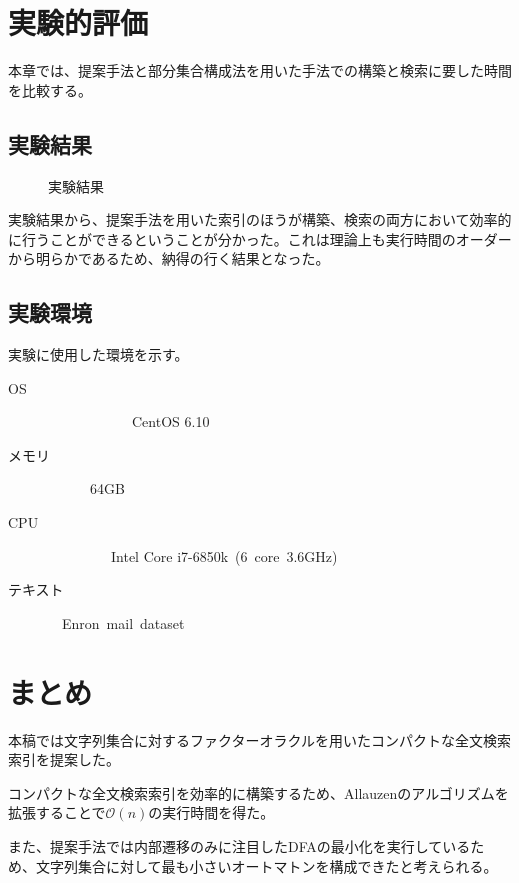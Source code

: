\documentclass[11pt,a4paper]{jreport}
\begin{document}
%

  \chapter{実験的評価}
  本章では、提案手法と部分集合構成法を用いた手法での構築と検索に要した時間を比較する。

  \section{実験結果}
  \begin{figure}[htbp]
    \centering

    \caption{実験結果}
  \end{figure}

  実験結果から、提案手法を用いた索引のほうが構築、検索の両方において効率的に行うことができるということが分かった。これは理論上も実行時間のオーダーから明らかであるため、納得の行く結果となった。

  \section{実験環境}
  実験に使用した環境を示す。

  \begin{description}
    \item[OS]\ \ \ \ \ \ \ \ \ \ \ \ CentOS 6.10
    \item[メモリ]\ \ \ \ \ \ 64GB
    \item[CPU]\ \ \ \ \ \ \ \ \ Intel Core i7-6850k\ (6\ core\ 3.6GHz)
    \item[テキスト]\ \ Enron\ mail\ dataset
  \end{description}

  \chapter{まとめ}

  本稿では文字列集合に対するファクターオラクルを用いたコンパクトな全文検索索引を提案した。

  コンパクトな全文検索索引を効率的に構築するため、Allauzenのアルゴリズムを拡張することで$\mathcal{O}(n)$の実行時間を得た。
  
  また、提案手法では内部遷移のみに注目したDFAの最小化を実行しているため、文字列集合に対して最も小さいオートマトンを構成できたと考えられる。
\end{document}
